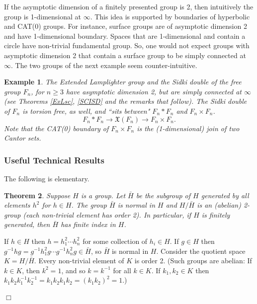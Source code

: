 \documentclass[12pt]{article}
\newtheorem{theorem}{Theorem}[subsection]
\newtheorem{example}[theorem]{Example}
\newenvironment{proof}{\addvspace{12pt}\noindent{\bf Proof:}}{
$\Box$\par\addvspace{12pt}}
\begin{document}
If the asymptotic dimension of a finitely presented group is 2, then intuitively the group is 1-dimensional at $\infty$. This idea is supported by boundaries of hyperbolic and CAT(0) groups. For instance, surface groups are of asymptotic dimension 2 and have 1-dimensional boundary. Spaces that are 1-dimensional and contain a circle have non-trivial fundamental group. So, one would not expect groups with asymptotic dimension 2 that contain a surface group to be simply connected at $\infty$. The two groups of the next example seem counter-intuitive. 

\begin{example} The Extended Lamplighter group and the Sidki double of the free group $F_n$, for $n\geq 3$ have asymptotic dimension 2, but are simply connected at $\infty$ (see Theorems \ref{ExLsc}, \ref{SCISD} and the remarks that follow). The Sidki double of $F_n$ is torsion free, as well, and ``sits between" $F_n\ast F_n$ and $F_n\times F_n$.
$$F_n\ast F_n\to \mathfrak{X}(F_n) \to F_n\times F_n.$$
Note that the CAT(0) boundary of $F_n\times F_n$ is the (1-dimensional) join of two Cantor sets.
\end{example}

\subsubsection{Useful Technical Results}\label{tech}

The following is elementary.
\begin{theorem}\label{squares}
Suppose $H$ is a group. Let $\bar H$ be the subgroup of $H$ generated by all elements $h^2$ for $h\in H$. The group $\bar H$ is normal in $H$ and $H/ \bar H$ is an (abelian) 2-group (each non-trivial element has order 2). In particular, if $H$ is finitely generated, then $\bar H$ has finite index in $H$.   
\end{theorem}
\begin{proof}
If $h\in H$ then $h=h_1^2\cdots h_n^2$ for some collection of $h_i\in H$. If $g\in H$ then $g^{-1}hg=g^{-1}h_1^2g\cdots g^{-1}h_n^2g\in \bar H$, so $\bar H$ is normal in $H$. Consider the quotient space $K=H/\bar H$. Every non-trivial element of $K$ is order 2.  (Such groups are abelian: If $k\in K$, then $k^2=1$, and so $k=k^{-1}$ for all $k\in K$.  If $k_1,k_2\in K$ then $k_1k_2k_1^{-1}k_2^{-1}=k_1k_2k_1k_2=(k_1k_2)^2=1$.) 
\end{proof}
\end{document}
